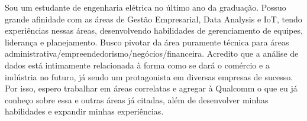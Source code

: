 

\begin{cvparagraph}

Sou um estudante de engenharia elétrica no último ano da graduação. Possuo grande afinidade com as áreas de Gestão Empresarial, Data Analysis e IoT, tendo experiências nessas áreas, desenvolvendo habilidades de gerenciamento de equipes, liderança e planejamento. Busco pivotar da área puramente técnica para áreas administrativa/empreendedorismo/negócios/financeira. Acredito que a análise de dados está intimamente relacionada à forma como se dará o comércio e a indústria no futuro, já sendo um protagonista em diversas empresas de sucesso. Por isso, espero trabalhar em áreas correlatas e agregar à Qualcomm o que eu já conheço sobre essa e outras áreas já citadas, além de desenvolver minhas habilidades e expandir minhas experiências.
\end{cvparagraph}
